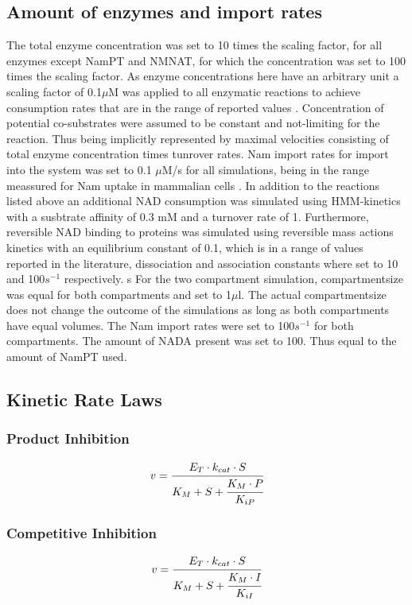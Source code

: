 \documentclass[a4paper,10pt]{article}
\begin{document}
\subsection*{Amount of enzymes and import rates}
The total enzyme concentration was set to 10 times the scaling factor, for all enzymes except NamPT and NMNAT, for which the concentration was set to 100 times the scaling factor. As enzyme concentrations here have an arbitrary unit a scaling factor of 0.1$\mu$M  was applied to all enzymatic reactions to achieve consumption rates that are in the range of reported values  \cite{Liu2018}. Concentration of potential co-substrates were assumed to be constant and not-limiting for the reaction. Thus being implicitly represented by maximal velocities consisting of total enzyme concentration times tunrover rates. Nam import rates for import into the system was set to 0.1 $\mu$M/s for all simulations, being in the range meassured for Nam uptake in mammalian cells \cite{Namuptake}. In addition to the reactions listed above an additional NAD consumption was simulated using HMM-kinetics with a susbtrate affinity of 0.3 mM and a turnover rate of 1. Furthermore, reversible NAD binding to proteins was simulated using reversible mass actions kinetics with an equilibrium constant of 0.1, which is in a range of values reported in the literature, dissociation and association constants where set to 10 and 100$s^{-1}$ respectively.
s
For the two compartment simulation, compartmentsize was equal for both compartments and set to 1$\mu$l. The actual compartmentsize does not change the outcome of the simulations as long as both compartments have equal volumes. The Nam import rates were set to 100$s^{-1}$ for both compartments. The amount of NADA present was set to 100. Thus equal to the amount of NamPT used. 

\subsection*{Kinetic Rate Laws}


\subsubsection*{Product Inhibition}
\begin{equation}
v=\cfrac{E_T\cdot k_{cat}\cdot S}{K_M + S + \cfrac{K_M\cdot P}{K_{iP}} }
\end{equation}

\subsubsection*{Competitive Inhibition}
\begin{equation}
v=\cfrac{E_T\cdot k_{cat}\cdot S}{K_M + S + \cfrac{K_M\cdot I}{K_{iI}} }
\end{equation}
\end{document}
